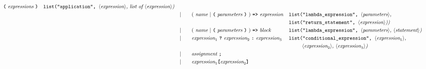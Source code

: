 \begin{alignat*}{9}
                                            \textbf{\texttt{(}}\ \textit{expressions}\
                                            \textbf{\texttt{)}}
                                                           && \texttt{list("application",  } \langle \textit{expression}\rangle \textit{, list of  } \langle \textit{expression}\rangle \textit{)} \\
&&                       && |   &\quad &&   (\ \textit{name}\ | \
                                               \textbf{\texttt{(}}\ \textit{parameters}\ \textbf{\texttt{)}}\
                                            )\
                                            \texttt{\textbf{=>}}\ \textit{expression}
                                            && \texttt{list("lambda\_expression",  } \langle \textit{parameters}\rangle \textit{,}  \\
                                              && && & && && \texttt{list("return\_statement",  } \langle \textit{expression}\rangle \textit{))} \\
&&                       && |   &\quad &&   (\ \textit{name}\ | \
                                               \textbf{\texttt{(}}\ \textit{parameters}\ \textbf{\texttt{)}}\
                                            )\
                                            \texttt{\textbf{=>}}\ \textit{block}
                                                           && \texttt{list("lambda\_expression",  } \langle \textit{parameters}\rangle \textit{,  } \langle \textit{statement}\rangle \textit{)} \\
&&                       && |   &\quad &&   \textit{expression}_1 \ \textbf{\texttt{?}}\
                                            \textit{expression}_2
                                            \ \textbf{\texttt{:}}\
                                            \textit{expression}_3\
                                                           && \texttt{list("conditional\_expression",  } \langle \textit{expression}_1\rangle \textit{,} \\
                                            &&&&&&&&&\ \ \ \ \ \ \texttt{ } \langle \textit{expression}_2\rangle \textit{,  } \langle \textit{expression}_3\rangle \textit{)} \\
&&                       && |   &\quad && \textit{assignment} \ \textbf{\texttt{;}}
                                                           && \\
&&                       && |   &\quad && \textit{expression}_1 \textbf{\texttt{[}}
                                          \textit{expression}_2 \textbf{\texttt{]}}

\end{alignat*}

